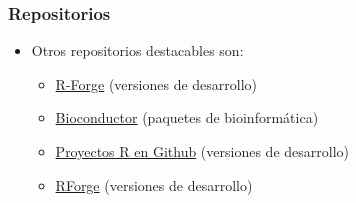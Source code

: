\documentclass[xcolor={usenames,svgnames,dvipsnames}]{beamer}
\begin{document}
\begin{frame}
\frametitle{Repositorios}
\label{sec-3-6}


\begin{itemize}
\item Otros repositorios destacables son:
\begin{itemize}
\item \href{http://r-forge.r-project.org/}{R-Forge} (versiones de desarrollo)
\item \href{http://www.bioconductor.org/}{Bioconductor} (paquetes de bioinformática)
\item \href{https://github.com/languages/R}{Proyectos R en Github} (versiones de desarrollo)
\item \href{http://rforge.net/}{RForge} (versiones de desarrollo)
\end{itemize}
\end{itemize}
\end{frame}
\end{document}
